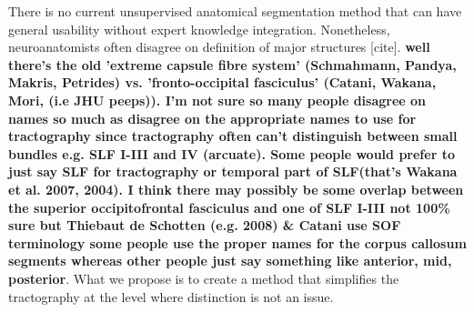 \documentclass{bioinfo}
\begin{document}

There is no current unsupervised anatomical segmentation method that can
have general usability without expert knowledge integration. Nonetheless, neuroanatomists often disagree on definition of major structures \citep{schmahmann2009fiber} [cite]. \textbf{well there's the old 'extreme capsule fibre system' (Schmahmann, Pandya, Makris, Petrides) vs. 'fronto-occipital fasciculus' (Catani, Wakana, Mori, (i.e JHU peeps)). I'm not sure so many people disagree on names so much as disagree on the appropriate names to use for tractography since tractography often can't distinguish between small bundles e.g. SLF I-III and IV (arcuate). Some people would prefer to just say SLF for tractography or temporal part of SLF(that's Wakana et al. 2007, 2004). I think there may possibly be some overlap between the superior occipitofrontal fasciculus and one of SLF I-III not 100\% sure but Thiebaut de Schotten (e.g. 2008) \& Catani use SOF terminology some people use the proper names for the corpus callosum segments whereas other people just say something like anterior, mid, posterior}. What we propose is to create a method that simplifies the tractography at the level where distinction is not an issue.
\end{document}
